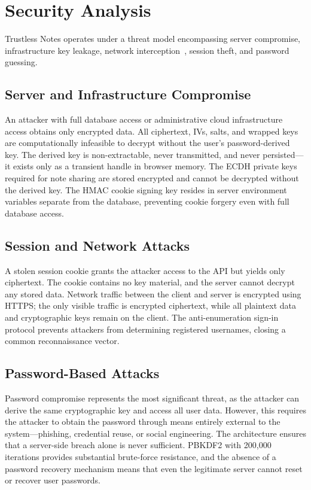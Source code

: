 \documentclass[conference]{IEEEtran}
\begin{document}
\section{Security Analysis}

Trustless Notes operates under a threat model encompassing server compromise, infrastructure key leakage, network interception~\cite{ref18}, session theft, and password guessing.

\subsection{Server and Infrastructure Compromise}

An attacker with full database access or administrative cloud infrastructure access obtains only encrypted data. All ciphertext, IVs, salts, and wrapped keys are computationally infeasible to decrypt without the user's password-derived key. The derived key is non-extractable, never transmitted, and never persisted---it exists only as a transient handle in browser memory. The ECDH private keys required for note sharing are stored encrypted and cannot be decrypted without the derived key. The HMAC cookie signing key resides in server environment variables separate from the database, preventing cookie forgery even with full database access.

\subsection{Session and Network Attacks}

A stolen session cookie grants the attacker access to the API but yields only ciphertext. The cookie contains no key material, and the server cannot decrypt any stored data. Network traffic between the client and server is encrypted using HTTPS; the only visible traffic is encrypted ciphertext, while all plaintext data and cryptographic keys remain on the client. The anti-enumeration sign-in protocol prevents attackers from determining registered usernames, closing a common reconnaissance vector.

\subsection{Password-Based Attacks}

Password compromise represents the most significant threat, as the attacker can derive the same cryptographic key and access all user data. However, this requires the attacker to obtain the password through means entirely external to the system---phishing, credential reuse, or social engineering. The architecture ensures that a server-side breach alone is never sufficient. PBKDF2 with 200,000 iterations provides substantial brute-force resistance, and the absence of a password recovery mechanism means that even the legitimate server cannot reset or recover user passwords.
\end{document}
